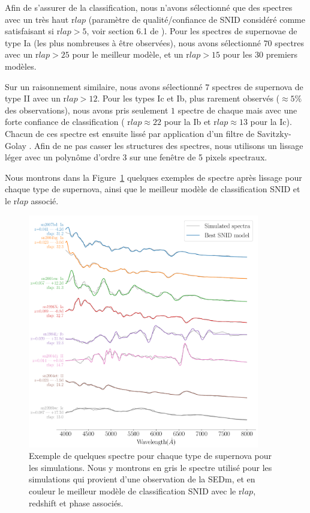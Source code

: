 \documentclass[../main/main.tex]{subfiles}
\begin{document}
Afin de s'assurer de la classification, nous n'avons sélectionné que des
spectres avec un très haut r$lap$ (paramètre de qualité/confiance de SNID considéré
comme satisfaisant si r$lap>5$, voir section 6.1 de \citet{BlondinSNID}). Pour
les spectres de supernovae de type Ia (les plus nombreuses à être observées), nous avons
sélectionné $70$ spectres avec un r$lap>25$ pour le meilleur modèle, et un r$lap>15$ pour les 30 premiers modèles.

Sur un raisonnement similaire, nous avons sélectionné $7$ spectres de
supernova de type II avec un r$lap>12$. Pour les types Ic et Ib, plus
rarement observés ($\approx5\%$ des observations), nous avons
pris seulement $1$ spectre de chaque mais avec une forte
confiance de classification ( r$lap\approx22$ pour la Ib et r$lap\approx13$
pour la Ic).
Chacun de ces spectre est ensuite lissé par application d'un filtre de Savitzky-Golay \citep{SavitzkyGolay}. Afin de ne pas casser les
structures des spectres, nous utilisons un lissage léger avec un
polynôme d'ordre 3 sur une fenêtre de 5 pixels spectraux.

Nous montrons dans la Figure~\ref{fig:specsimueach} quelques exemples de
spectre après lissage pour chaque type de supernova, ainsi que le
meilleur modèle de classification SNID et le r$lap$ associé.

\begin{figure}[ht]
  \centering
  \includegraphics[width=0.9\textwidth]{../figures/08_simu/specsimueach.pdf}
  \caption[Exemple de spectres pour chaque type de supernova pour les
  simulations.]{Exemple de quelques spectre pour chaque type de supernova pour
    les simulations. Nous y montrons en gris le spectre utilisé pour les
    simulations qui provient d'une
    observation de la SEDm, et en couleur le meilleur
  modèle de classification SNID avec le r$lap$, redshift et phase associés.}
  \label{fig:specsimueach}
\end{figure}
\clearpage
\end{document}
